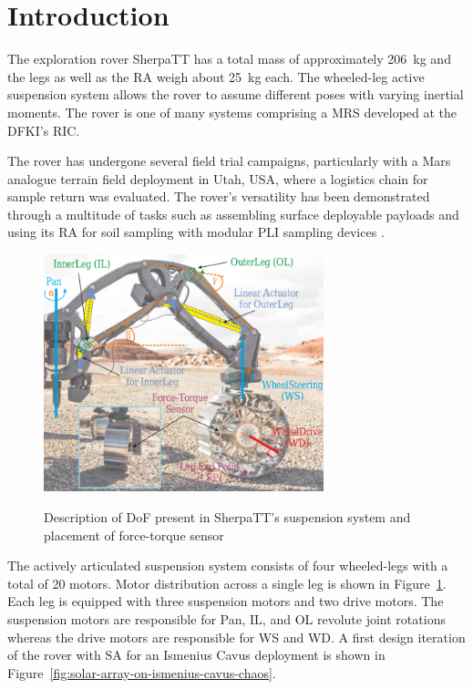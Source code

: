 \documentclass[twocolumn,letterpaper]{IEEEAerospaceCLS}  %
\newcommand{\refFig}[1]{{Figure}~\ref{#1}} %
\begin{document}

\section{Introduction}
The exploration rover SherpaTT has a total mass of approximately \SI{206}{\kilo\gram} and the legs as well as the \ac{RA} weigh about \SI{25}{\kilo\gram} each. The wheeled-leg active suspension system allows the rover to assume different poses with varying inertial moments. The rover is one of many systems comprising a \ac{MRS} developed at the \ac{DFKI}'s \ac{RIC}.

The rover has undergone several field trial campaigns, particularly with a Mars analogue terrain field deployment in Utah, USA, where a logistics chain for sample return was evaluated. The rover's versatility has been demonstrated through a multitude of tasks such as assembling surface deployable payloads and using its \ac{RA} for soil sampling with modular \ac{PLI} sampling devices \cite{Cordes2018b}.

\begin{figure}[h]
  \centering
  \includegraphics[width=3.2in]{figures/images/sherpatt-actively-articulated-suspension-sytem.png}\\
  \caption{Description of DoF present in SherpaTT’s
suspension system and placement of force-torque sensor}
  \label{fig:sherpatt-actively-articulated-suspension-system}
\end{figure}

The actively articulated suspension system consists of four wheeled-legs with a total of 20 motors. Motor distribution across a single leg is shown in \refFig{fig:sherpatt-actively-articulated-suspension-system}. Each leg is equipped with three suspension motors and two drive motors. The suspension motors are responsible for Pan, \ac{IL}, and \ac{OL} revolute joint rotations whereas the drive motors are responsible for \ac{WS} and \ac{WD}. A first design iteration of the rover with \ac{SA} for an Ismenius Cavus deployment is shown in \refFig{fig:solar-array-on-ismenius-cavus-chaos}.
\end{document}
